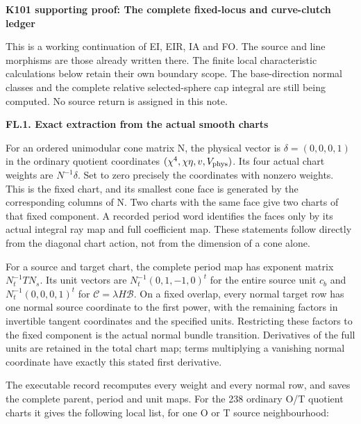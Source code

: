 \par\bigskip\noindent\textbf{K101 supporting proof: The complete fixed-locus and curve-clutch ledger}\par\nobreak
This is a working continuation of EI, EIR, IA and FO. The source and
line morphisms are those already written there. The finite local
characteristic calculations below retain their own boundary scope.
The base-direction normal classes and the complete relative
selected-sphere cap integral are still being computed. No source
return is assigned in this note.

\par

\medskip\noindent\textbf{FL.1. Exact extraction from the actual smooth charts}

\par\nobreak

For an ordered unimodular cone matrix N, the physical vector is
\(\delta=(0,0,0,1)\) in the ordinary quotient coordinates
\((\chi^4,\chi\eta,v,V_{\rm phys})\). Its four actual chart
weights are \(N^{-1}\delta\). Set to zero precisely the
coordinates with nonzero weights. This is the fixed chart,
and its smallest cone face is generated by the corresponding
columns of N. Two charts with the same face give two charts of
that fixed component. A recorded period word identifies the
faces only by its actual integral ray map and full coefficient
map. These statements follow directly from the diagonal chart
action, not from the dimension of a cone alone.

For a source and target chart, the complete period map has
exponent matrix \(N_t^{-1}T N_s\). Its unit vectors are
\(N_t^{-1}(0,1,-1,0)^t\) for the entire source unit \(c_b\)
and \(N_t^{-1}(0,0,0,1)^t\) for
\(\mathcal C=\lambda H\mathcal B\). On a fixed overlap,
every normal target row has one normal source coordinate to
the first power, with the remaining factors in invertible
tangent coordinates and the specified units. Restricting
these factors to the fixed component is the actual normal
bundle transition. Derivatives of the full units are retained
in the total chart map; terms multiplying a vanishing normal
coordinate have exactly this stated first derivative.

The executable record
 recomputes every
weight and every normal row, and saves the complete parent,
period and unit maps. For the 238 ordinary O/T quotient
charts it gives the following local list, for one O or T
source neighbourhood:

